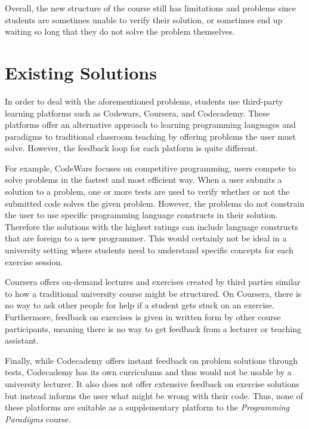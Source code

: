 {Overall, the new structure of the course still has limitations and problems since students are sometimes unable to verify their solution, or sometimes end up waiting so long that they do not solve the problem themselves.

\section{Existing Solutions}
In order to deal with the aforementioned problems, students use third-party learning platforms such as Codewars\cite{Codewars}, Coursera\cite{Coursera}, and Codecademy\cite{Codecademy}.
These platforms offer an alternative approach to learning programming languages and paradigms to traditional classroom teaching by offering problems the user must solve.
However, the feedback loop for each platform is quite different.

For example, CodeWars focuses on competitive programming, users compete to solve problems in the fastest and most efficient way. 
When a user submits a solution to a problem, one or more tests are used to verify whether or not the submitted code solves the given problem.
However, the problems do not constrain the user to use specific programming language constructs in their solution.
Therefore the solutions with the highest ratings can include language constructs that are foreign to a new programmer.
This would certainly  not be ideal in a university setting where students need to understand specific concepts for each exercise session.


Coursera offers on-demand lectures and exercises created by third parties similar to how a traditional university course might be structured.
On Coursera, there is no way to ask other people for help if a student gets stuck on an exercise.
Furthermore, feedback on exercises is given in written form by other course participants, meaning there is no way to get feedback from a lecturer or teaching assistant.


Finally, while Codecademy offers instant feedback on problem solutions through tests,  Codecademy has its own curriculums and thus would not be usable by a university lecturer.
It also does not offer extensive feedback on exercise solutions but instead informs the user what might be wrong with their code.
Thus, none of these platforms are suitable as a supplementary platform to the \textit{Programming Paradigms} course.
}
